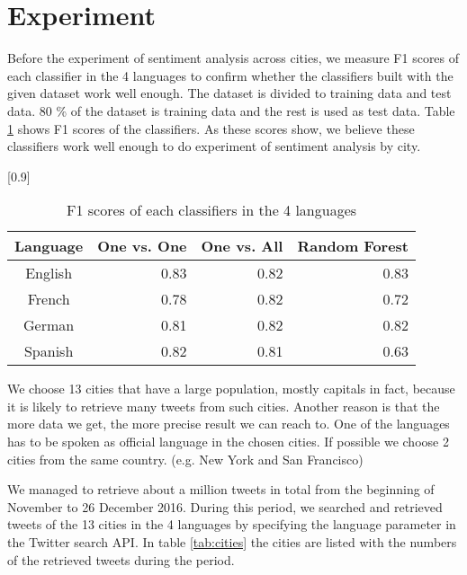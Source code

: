 \documentclass[twocolumn]{article}
\begin{document}
\vspace{-6mm}

\section{Experiment}
\vspace{-2mm}
Before the experiment of sentiment analysis across cities, we measure F1 scores of each classifier in the 4 languages to confirm whether the classifiers built with the given dataset work well enough.
The dataset is divided to training data and test data.
80 \% of the dataset is training data and the rest is used as test data.
Table \ref{tab:f1score} shows F1 scores of the classifiers.
As these scores show, we believe these classifiers work well enough to do experiment of sentiment analysis by city.

\begin{table}[ht]
	\caption{F1 scores of each classifiers in the 4 languages}
	\scalebox{0.8}[0.9]{
	\begin{tabular}{|c|r|r|r|} \hline
	Language&One vs. One&One vs. All&Random Forest\\ \hline \hline
	English & 0.83 & 0.82 & 0.83  \\ \hline
	French & 0.78 & 0.82 & 0.72  \\ \hline
	German & 0.81 & 0.82 & 0.82 \\ \hline
	Spanish & 0.82 & 0.81 & 0.63  \\ \hline
	\end{tabular}
	}
	\label{tab:f1score}
\end{table}

We choose 13 cities that have a large population, mostly capitals in fact, because it is likely to retrieve many tweets from such cities.
Another reason is that the more data we get, the more precise result we can reach to.
One of the languages has to be spoken as official language in the chosen cities.
If possible we choose 2 cities from the same country. (e.g. New York and San Francisco)

We managed to retrieve about a million tweets in total from the beginning of November to 26 December 2016.
During this period, we searched and retrieved tweets of the 13 cities in the 4 languages by specifying the language parameter in the Twitter search API.
In table \ref{tab:cities} the cities are listed with the numbers of the retrieved tweets during the period.
\end{document}
